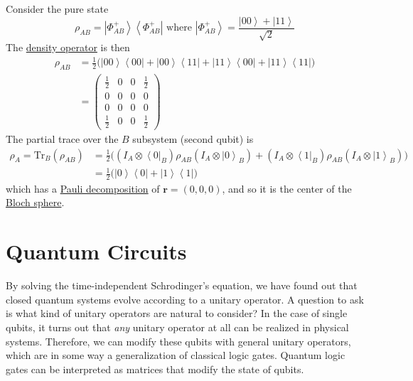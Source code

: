 \documentclass{article}
\newcommand{\ket}[1]{\ensuremath{\left|#1\right\rangle}}
\newcommand{\bra}[1]{\ensuremath{\left\langle#1\right|}}
\newcounter{question}[section]
\newcounter{example}[section]
\begin{document}
    \begin{example}
      \label{ex:partial-trace-of-maximally-entangled-state-is}
      Consider the pure state 
      \begin{equation}
        \rho_{AB} = \ket{\Phi^+_{AB}} \bra{\Phi^+_{AB}} \text{ where } \ket{\Phi^+_{AB}} = \frac{\ket{00} + \ket{11}}{\sqrt{2}}
      \end{equation}
      The \hyperref[def:density-operator]{density operator} is then 
      \begin{align}
        \rho_{AB} & = \frac{1}{2} \big( \ket{00} \bra{00} + \ket{00} \bra{11} + \ket{11} \bra{00} + \ket{11} \bra{11} \big) \\
                  & = \begin{pmatrix} \frac{1}{2} & 0 & 0 & \frac{1}{2} \\ 0 & 0 & 0 & 0 \\ 0 & 0 & 0 & 0 \\ \frac{1}{2} & 0 & 0 & \frac{1}{2} \end{pmatrix}
      \end{align}
      The partial trace over the $B$ subsystem (second qubit) is 
      \begin{align}
        \rho_A = \mathrm{Tr}_B (\rho_{AB}) & = \frac{1}{2} \big( (I_A \otimes \bra{0}_B) \rho_{AB} (I_A \otimes \ket{0}_B) + (I_A \otimes \bra{1}_B) \rho_{AB} (I_A \otimes \ket{1}_B) \big) \\ 
                                           & = \frac{1}{2} \big( \ket{0} \bra{0} + \ket{1} \bra{1} \big)
      \end{align}
      which has a \hyperref[def:pauli-decomposition]{Pauli decomposition} of $\mathbf{r} = (0, 0, 0)$, and so it is the center of the \hyperref[def:bloch-sphere]{Bloch sphere}.
    \end{example}

\section{Quantum Circuits}

    By solving the time-independent Schrodinger's equation, we have found out that closed quantum systems evolve according to a unitary operator. A question to ask is what kind of unitary operators are natural to consider? In the case of single qubits, it turns out that \textit{any} unitary operator at all can be realized in physical systems. Therefore, we can modify these qubits with general unitary operators, which are in some way a generalization of classical logic gates. Quantum logic gates can be interpreted as matrices that modify the state of qubits. 
\end{document}
